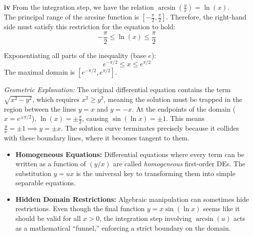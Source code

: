 \begin{solution}
\vspace{0.3cm}
\textbf{iv} From the integration step, we have the relation $\arcsin\left(\frac{y}{x}\right) = \ln(x)$. \\
The principal range of the arcsine function is $\left[ -\frac{\pi}{2}, \frac{\pi}{2} \right]$. Therefore, the right-hand side must satisfy this restriction for the equation to hold:
\[ -\frac{\pi}{2} \le \ln(x) \le \frac{\pi}{2} \]

Exponentiating all parts of the inequality (base $e$):
\[ e^{-\pi/2} \le x \le e^{\pi/2} \]
The maximal domain is \textbf{$[e^{-\pi/2}, e^{\pi/2}]$}.

\textit{Geometric Explanation:} The original differential equation contains the term $\sqrt{x^2 - y^2}$, which requires $x^2 \ge y^2$, meaning the solution must be trapped in the region between the lines $y = x$ and $y = -x$. At the endpoints of the domain ($x = e^{\pm\pi/2}$), $\ln(x) = \pm\frac{\pi}{2}$, causing $\sin(\ln x) = \pm 1$. This means $\frac{y}{x} = \pm 1 \implies y = \pm x$. The solution curve terminates precisely because it collides with these boundary lines, where it becomes tangent to them.
\end{solution}

\begin{takeaways}
\begin{itemize}[leftmargin=*]
    \item \textbf{Homogeneous Equations:} Differential equations where every term can be written as a function of $(y/x)$ are called \textit{homogeneous} first-order DEs. The substitution $y = ux$ is the universal key to transforming them into simple separable equations.
    \item \textbf{Hidden Domain Restrictions:} Algebraic manipulation can sometimes hide restrictions. Even though the final function $y = x \sin(\ln x)$ seems like it should be valid for all $x > 0$, the integration step involving $\arcsin(u)$ acts as a mathematical ``funnel,'' enforcing a strict boundary on the domain.
\end{itemize}
\end{takeaways}

